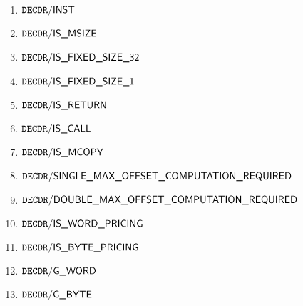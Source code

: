 \begin{enumerate}
	\item $\mxpDecoderInst$
	\item $\mxpDecoderIsMsize$
	\item $\mxpDecoderIsFixedSizeThirtyTwo$
	\item $\mxpDecoderIsFixedSizeOne$
	\item $\mxpDecoderIsReturn$
	\item $\mxpDecoderIsCall$
	\item $\mxpDecoderIsMcopy$
	\item $\mxpDecoderSingleMaxOffsetComputationRequired$
	\item $\mxpDecoderDoubleMaxOffsetComputationRequired$
	\item $\mxpDecoderIsWordPricing$
	\item $\mxpDecoderIsBytePricing$
	\item $\mxpDecoderGWord$
	\item $\mxpDecoderGByte$
\end{enumerate}
